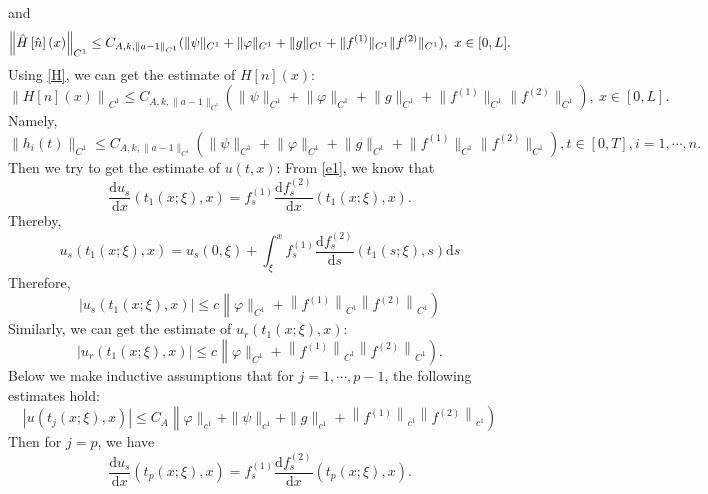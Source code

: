 \documentclass[a4paper,reqno,11pt]{amsart}
\numberwithin{equation}{section} %
\begin{document}
and
\begin{equation}\label{estimate of hat{H}}
	\left\| \hat{H}\left[ \hat{n} \right] \left( x \right) \right\|_{C^1} \leq C_{A,k,\lVert a-1 \rVert _{C^1}}(\lVert \psi \rVert _{C^1}+\lVert \varphi  \rVert _{C^1}+  \lVert g \rVert _{C^1}+\lVert f^{(1)} \rVert _{C^1}\lVert f^{(2)} \rVert _{C^1}) ,\ x\in [0,L].
\end{equation}
Using \eqref{H}, we can get the estimate of $H\left[ n \right] \left( x \right)$:
\begin{equation}\label{estimate of H[n]}
	\left\| H\left[ n \right] \left( x \right) \right\|_{C^1} \leq C_{A,k,\lVert a-1 \rVert _{C^1}}(\lVert \psi \rVert _{C^1}+\lVert \varphi  \rVert _{C^1}+  \lVert g \rVert _{C^1}+\lVert f^{(1)} \rVert _{C^1}\lVert f^{(2)} \rVert _{C^1}) ,\ x\in [0,L].
\end{equation}
Namely, 
\begin{equation}\label{estimate of h}	
\lVert h_i(t) \rVert _{C^1}  \leq C_{A,k,\lVert a-1 \rVert _{C^1}}(\lVert \psi \rVert _{C^1}+\lVert \varphi  \rVert _{C^1}+  \lVert g \rVert _{C^1}+\lVert f^{(1)} \rVert _{C^1}\lVert f^{(2)} \rVert _{C^1}) ,t \in [0,T],  i=1,\cdots,n.
\end{equation}
Then we try to get the estimate of $u(t,x)$:
From \eqref{e1}, we know that
$$
\frac{\mathrm{d}u_s}{\mathrm{d}x}\left( t_1(x;\xi ),x \right) =f_{s}^{(1)}\frac{\mathrm{d}f_{s}^{(2)}}{\mathrm{d}x}\left( t_1(x;\xi ),x \right) .
$$
Thereby,
$$
u_s\left( t_1\left( x;\xi \right) ,x \right) =u_s(0,\xi )+\int_{\xi}^x{f_{s}^{(1)}\frac{\mathrm{d}f_{s}^{(2)}}{\mathrm{d}s}\left( t_1\left( s;\xi \right) ,s \right) \mathrm{d}s}
$$
Therefore,
$$
\left| u_s\left( t_1(x;\xi ),x \right) \right|\leqslant c\left\| \varphi \parallel _{C^1}+\left\| f^{(1)} \right\| _{C^1}\left\| f^{(2)} \right\| _{C^1} \right) 
$$
Similarly, we can get the estimate of $u_r\left( t_1(x;\xi ),x \right) $:
$$
\left| u_r\left( t_1(x;\xi ),x \right) \right|\leqslant c\left\| \varphi \parallel _{C^1}+\left\| f^{(1)} \right\| _{C^1}\left\| f^{(2)} \right\| _{C^1} \right) .
$$
Below we make inductive assumptions that for $j=1,\cdots,p-1$, the following estimates hold:
\begin{equation}\label{inductive assumption}
\left| u\left( t_j(x;\xi ),x \right) \right|\leqslant C_A\left\| \varphi \parallel _{c^1}+\parallel \psi \parallel _{c^1}+\parallel g\parallel _{c^1}+\left\| f^{(1)} \right\| _{c^1}\left\| f^{(2)} \right\| _{c^1} \right) 
\end{equation}
Then for $j=p$, we have
$$
\frac{\mathrm{d}u_s}{\mathrm{d}x}\left( t_p(x;\xi ),x \right) =f_{s}^{(1)}\frac{\mathrm{d}f_{s}^{(2)}}{\mathrm{d}x}\left( t_p(x;\xi ),x \right) .
$$
\end{document}

